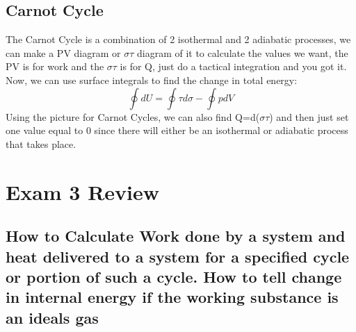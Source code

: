 \documentclass[arial]{article}
\begin{document}
\subsection*{Carnot Cycle}
The Carnot Cycle is a combination of 2 isothermal and 2 adiabatic processes, we can make a PV diagram or $\sigma\tau$ diagram of it to calculate the values we want, the PV is for work and the $\sigma\tau$ is for Q, just do a tactical integration and you got it. Now, we can use surface integrals to find the change in total energy:
\begin{equation}
\oint dU=\oint \tau d\sigma - \oint pdV
\end{equation}
Using the picture for Carnot Cycles, we can also find Q=d($\sigma \tau$) and then just set one value equal to 0 since there will either be an isothermal or adiabatic process that takes place. 

\section*{Exam 3 Review}
\subsection*{How to Calculate Work done by a system and heat delivered to a system for a specified cycle or portion of such a cycle. How to tell change in internal energy if the working substance is an ideals gas}
	
\end{document}
